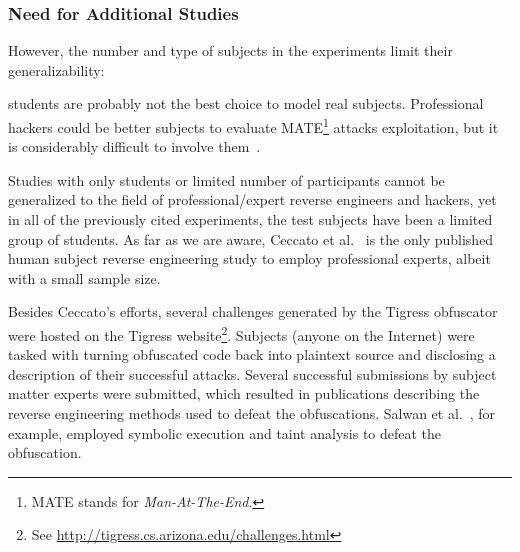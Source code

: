 
\subsubsection{Need for Additional Studies}
However, the number and type of subjects in the experiments limit their generalizability:

\begin{displayquote}
students are probably not the best choice to model real subjects. Professional hackers could be better subjects to evaluate MATE\footnote{MATE stands for {\em Man-At-The-End}.} attacks exploitation, but it is considerably difficult to involve them~\cite{viticchie2016assessment}.
\end{displayquote}

Studies with only students or limited number of participants cannot be generalized to the field of professional/expert reverse engineers and hackers, yet in all of the previously cited experiments, the test subjects have been a limited group of students. As far as we are aware, Ceccato et al.~\cite{ceccato2017professional} is the only published human subject reverse engineering study to employ professional experts, albeit with a small sample size.

Besides Ceccato's efforts, several challenges generated by the Tigress obfuscator~\cite{tigress} were hosted on the Tigress website\footnote{See \url{http://tigress.cs.arizona.edu/challenges.html}}. Subjects (anyone on the Internet) were tasked with turning obfuscated code back into plaintext source and disclosing a description of their successful attacks. Several successful submissions by subject matter experts were submitted, which resulted in publications describing the reverse engineering methods used to defeat the obfuscations.  Salwan et al.~\cite{salwan2018symbolic}, for example, employed symbolic execution and taint analysis to defeat the obfuscation.

